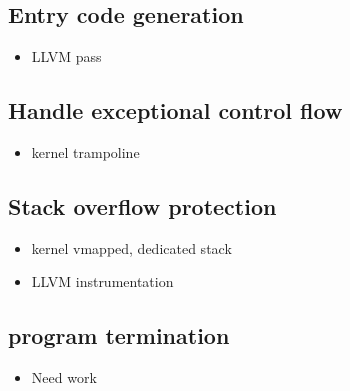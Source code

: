 \subsection{Entry code generation}
\begin{itemize}
    \item LLVM pass
\end{itemize}

\subsection{Handle exceptional control flow}
\begin{itemize}
    \item kernel trampoline
\end{itemize}

\subsection{Stack overflow protection}
\begin{itemize}
    \item kernel vmapped, dedicated stack
    \item LLVM instrumentation
\end{itemize}

\subsection{program termination}
\begin{itemize}
    \item Need work
\end{itemize}
